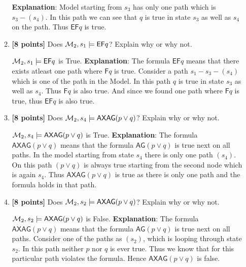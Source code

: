 \documentclass{article}
\def\Sometime{\mathord{\mathsf{F}}}
\def\Forever{\mathord{\mathsf{G}}}
\def\NextX{\mathord{\mathsf{X}}}
\def\All{\mathord{\mathsf{A}}}
\def\Exists{\mathord{\mathsf{E}}}
\begin{document}
\begin{itemize}
\begin{enumerate}
\begin{answer}
    	\textbf{Explanation}: Model starting from $s_3$ has only one path which is
    	$s_3-(s_4)$. In this path we can see that $q$ is true in state $s_3$ as
    	well as $s_4$ on the path. Thus $\Exists \Sometime q$ is true.
    \end{answer}
    \bigskip
  \item \textbf{[8 points]} Does ${\cal M}_2, s_1 \models \Exists
    \Sometime q$?  Explain why or why not.
    \begin{answer}
    	${\cal M}_2, s_1 \models \Exists \Sometime q$ is True.	\newline	
    	\textbf{Explanation}: The formula $\Exists \Sometime q$ means that there
    	exists atleast one path where $\Sometime q$ is true. Consider a path
    	$s_1-s_3-(s_4)$ which is one of the path in the Model. In this path $q$ is
    	true in state $s_3$ as well as $s_4$. Thus $\Sometime q$ is also true. And
    	since we found one path where $\Sometime q$ is true, thus $\Exists
    	\Sometime q$ is also true.
    \end{answer}
    \bigskip
  \item \textbf{[8 points]} Does ${\cal M}_2, s_4 \models \All
    \NextX \All \Forever (p \lor q)$?  Explain why or why not.
    \begin{answer}
    	${\cal M}_2, s_4 \models \All \NextX \All \Forever (p \lor q)$ is True.
    	\newline
    	\textbf{Explanation}: The formula $\All \NextX \All \Forever (p \lor q)$
    	means that the formula $\All \Forever (p \lor q)$ is true next on all
    	paths. In the model starting from state $s_4$ there is only one path
    	$(s_4)$. On this path $(p \lor q)$ is always true starting from the second
    	node which is again $s_4$. Thus $\All \NextX \All \Forever (p \lor q)$ is
    	true as there is only one path and the formula holds in that path.
    \end{answer}
    \bigskip
  \item \textbf{[8 points]} Does ${\cal M}_2, s_2 \models \All \NextX
    \All \Forever (p \lor q)$?  Explain why or why not.
    \begin{answer}
    	${\cal M}_2, s_2 \models \All \NextX \All \Forever (p \lor q)$ is False.
    	\newline
    	\textbf{Explanation}: The formula $\All \NextX \All \Forever (p \lor q)$
    	means that the formula $\All \Forever (p \lor q)$ is true next on all
    	paths. Consider one of the paths as $(s_2)$, which is looping through state
    	$s_2$. In this path neither $p$ nor $q$ is ever true. Thus we know that for
    	this particular path violates the formula. Hence $\All \NextX \All
    	\Forever (p \lor q)$ is false.
     \end{answer}
    \bigskip
  \end{enumerate}


\end{itemize}
\end{document}
